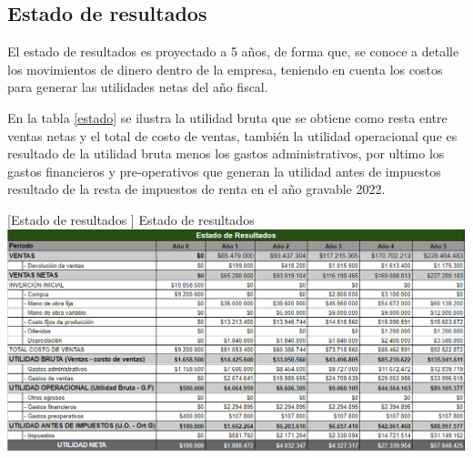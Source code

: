 \subsection{Estado de resultados}
El estado de resultados es proyectado a 5 años, de forma que, se conoce a detalle los movimientos de dinero dentro de la empresa, teniendo en cuenta los costos para generar las utilidades netas del año fiscal.

En la tabla \ref{estado} se ilustra la utilidad bruta que se obtiene como resta entre ventas netas y el total de costo de ventas, también la utilidad operacional que es resultado de la utilidad bruta menos los gastos administrativos, por ultimo los gastos financieros y pre-operativos que generan la utilidad antes de impuestos resultado de la resta de impuestos de renta en el año gravable 2022.

\vspace{2mm}
\begin{minipage}{0.9\textwidth}
\centering
{}[{Estado de resultados }]{ Estado de resultados }
\label{estado}
\includegraphics[width=1.1\textwidth]{Images/estadoResultados.png}
\end{minipage}
\newpage